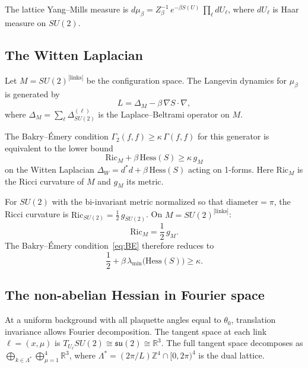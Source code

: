\documentclass[11pt,a4paper]{article}
\theoremstyle{plain}
\theoremstyle{definition}
\theoremstyle{remark}
\newcommand{\R}{\mathbb{R}}
\newcommand{\Z}{\mathbb{Z}}
\newcommand{\Hess}{\mathrm{Hess}}
\newcommand{\Ric}{\mathrm{Ric}}
\newcommand{\su}{\mathfrak{su}}
\begin{document}
The lattice Yang--Mills measure is
$d\mu_\beta = Z_\beta^{-1}\,e^{-\beta S(U)}\,\prod_\ell dU_\ell$,
where $dU_\ell$ is Haar measure on $SU(2)$.

\subsection{The Witten Laplacian}

Let $M = SU(2)^{|\mathrm{links}|}$ be the configuration space.
The Langevin dynamics for $\mu_\beta$ is generated by
\begin{equation}\label{eq:langevin}
  L = \Delta_M - \beta\,\nabla S \cdot \nabla,
\end{equation}
where $\Delta_M = \sum_\ell \Delta_{SU(2)}^{(\ell)}$ is the
Laplace--Beltrami operator on $M$.

The Bakry--\'Emery condition
$\Gamma_2(f, f) \geq \kappa\,\Gamma(f, f)$ for this generator
is equivalent to the lower bound
\begin{equation}\label{eq:BE}
  \Ric_M + \beta\,\Hess(S) \geq \kappa\,g_M
\end{equation}
on the Witten Laplacian $\Delta_W = d^* d + \beta\,\Hess(S)$
acting on 1-forms.
Here $\Ric_M$ is the Ricci curvature of $M$ and $g_M$ its metric.

For $SU(2)$ with the bi-invariant metric normalized so that
$\mathrm{diameter} = \pi$, the Ricci curvature is
$\Ric_{SU(2)} = \frac{1}{2}\,g_{SU(2)}$.
On $M = SU(2)^{|\mathrm{links}|}$:
\begin{equation}\label{eq:ricci}
  \Ric_M = \frac{1}{2}\,g_M.
\end{equation}
The Bakry--\'Emery condition~\eqref{eq:BE} therefore reduces to
\begin{equation}\label{eq:BE-reduced}
  \frac{1}{2} + \beta\,\lambda_{\min}\bigl(\Hess(S)\bigr) \geq \kappa.
\end{equation}


\subsection{The non-abelian Hessian in Fourier space}

At a uniform background with all plaquette angles equal to $\theta_0$,
translation invariance allows Fourier decomposition.
The tangent space at each link $\ell = (x, \mu)$ is
$T_{U_\ell} SU(2) \cong \su(2) \cong \R^3$.
The full tangent space decomposes as
$\bigoplus_{k \in \Lambda^*} \bigoplus_{\mu=1}^{4} \R^3$,
where $\Lambda^* = (2\pi/L)\Z^4 \cap [0, 2\pi)^4$ is the
dual lattice.
\end{document}
